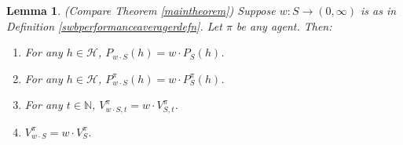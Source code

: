 \documentclass[twoside]{article}
\newtheorem{lemma}[theorem]{Lemma}
\begin{document}
\begin{lemma}
\label{envmaintheorem}
    (Compare Theorem \ref{maintheorem})
    Suppose $w:S\to(0,\infty)$ is as in Definition \ref{swbperformanceaveragerdefn}.
    Let $\pi$ be any agent. Then:
    \begin{enumerate}
        \item
        For any $h\in\mathcal H$,
        $P_{w\cdot S}(h)=w\cdot P_{S}(h)$.
        \item
        For any $h\in\mathcal H$,
        $P^\pi_{w\cdot S}(h)=w\cdot P^\pi_{S}(h)$.
        \item
        For any $t\in\mathbb N$,
        $V^\pi_{w\cdot S,t}=w\cdot V^\pi_{S,t}$.
        \item
        $V^\pi_{w\cdot S}=w\cdot V^\pi_{S}$.
    \end{enumerate}
\end{lemma}
\end{document}
